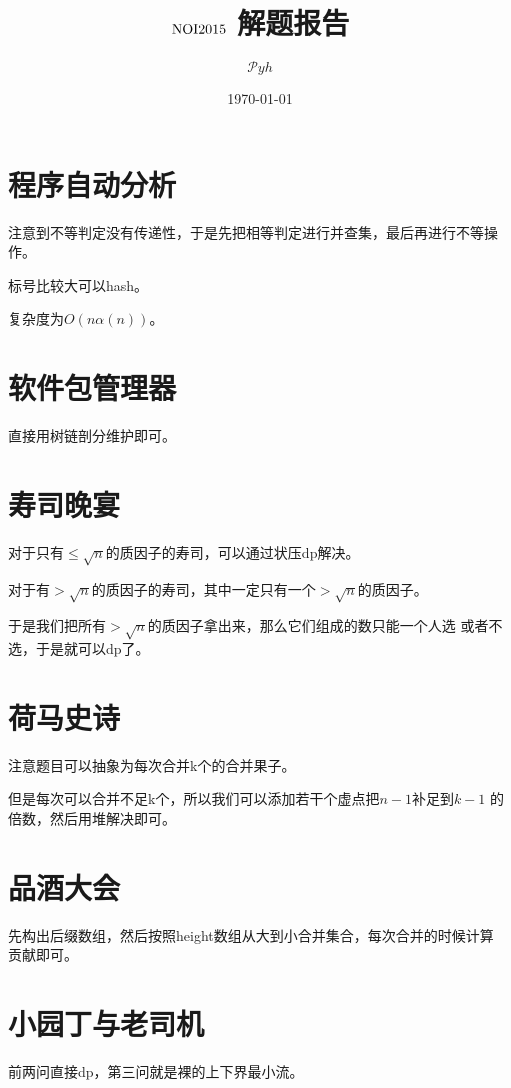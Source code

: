 \documentclass[a4paper]{article}
\date{\today}
\title{$\rm NOI2015$ 解题报告}
\author{$\mathcal Pyh$}
\newcommand{\kai}{\CJKfamily{kai}}
\begin{document}
\maketitle

\kai

\section{程序自动分析}

注意到不等判定没有传递性，于是先把相等判定进行并查集，最后再进行不等操
作。

标号比较大可以hash。

复杂度为$O(n\alpha(n))$。

\section{软件包管理器}

直接用树链剖分维护即可。

\section{寿司晚宴}

对于只有$\leq \sqrt{n}$的质因子的寿司，可以通过状压dp解决。

对于有$> \sqrt{n}$的质因子的寿司，其中一定只有一个$> \sqrt{n}$的质因子。

于是我们把所有$> \sqrt{n}$的质因子拿出来，那么它们组成的数只能一个人选
或者不选，于是就可以dp了。

\section{荷马史诗}

注意题目可以抽象为每次合并k个的合并果子。

但是每次可以合并不足k个，所以我们可以添加若干个虚点把$n-1$补足到$k-1$
的倍数，然后用堆解决即可。

\section{品酒大会}

先构出后缀数组，然后按照height数组从大到小合并集合，每次合并的时候计算
贡献即可。

\section{小园丁与老司机}

前两问直接dp，第三问就是裸的上下界最小流。
\end{document}
